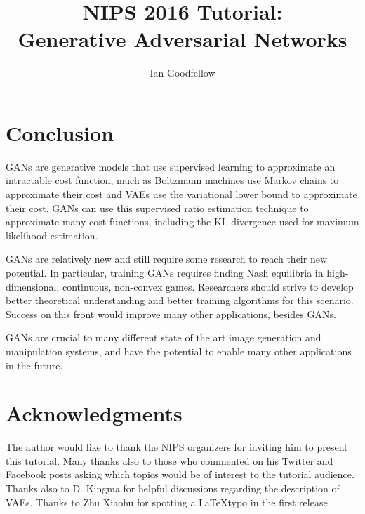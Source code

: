 \documentclass[]{article}
\title{NIPS 2016 Tutorial:\\ Generative Adversarial Networks}
\author{Ian Goodfellow}
\affil{OpenAI, {\tt ian@openai.com}}
\date{}
\DeclareRobustCommand{\[}{\begin{equation}}
\DeclareRobustCommand{\]}{\end{equation}}
\begin{document}
\newlength{\figwidth}
\setlength{\figwidth}{26pc}

\maketitle












\section{Conclusion}

GANs are generative models that use supervised learning to approximate an intractable cost
function, much as Boltzmann machines use Markov chains to approximate their cost and VAEs
use the variational lower bound to approximate their cost.
GANs can use this supervised ratio estimation technique to approximate many cost functions, including the KL divergence used for maximum
likelihood estimation.

GANs are relatively new and still require some research to reach their new potential.
In particular, training GANs requires finding Nash equilibria in high-dimensional,
continuous, non-convex games.
Researchers should strive to develop better theoretical understanding and better training
algorithms for this scenario.
Success on this front would improve many other applications, besides GANs.

GANs are crucial to many different state of the art image generation and manipulation systems,
and have the potential to enable many other applications in the future.

\section*{Acknowledgments}
The author would like to thank the NIPS organizers for inviting him to
present this tutorial.
Many thanks also to those who commented on his Twitter and Facebook posts
asking which topics would be of interest to the tutorial audience.
Thanks also to D. Kingma for helpful discussions regarding the description of VAEs.
Thanks to Zhu Xiaohu for spotting a \LaTeX typo in the first release.



\end{document}
